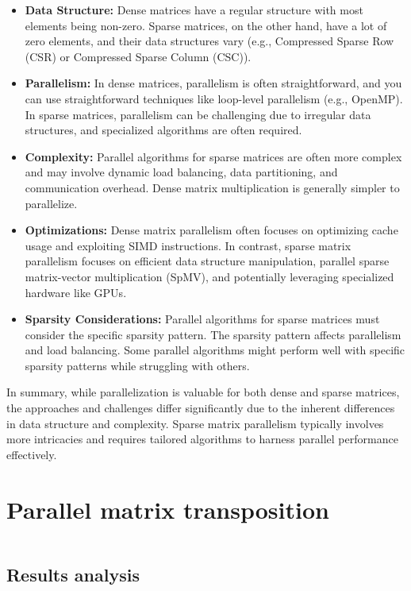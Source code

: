 \documentclass{article}
\begin{document}
\begin{itemize}
    \item \textbf{Data Structure:} Dense matrices have a regular structure with most elements being non-zero. Sparse matrices, on the other hand, have a lot of zero elements, and their data structures vary (e.g., Compressed Sparse Row (CSR) or Compressed Sparse Column (CSC)).
    \item \textbf{Parallelism:} In dense matrices, parallelism is often straightforward, and you can use straightforward techniques like loop-level parallelism (e.g., OpenMP). In sparse matrices, parallelism can be challenging due to irregular data structures, and specialized algorithms are often required.
    \item \textbf{Complexity:} Parallel algorithms for sparse matrices are often more complex and may involve dynamic load balancing, data partitioning, and communication overhead. Dense matrix multiplication is generally simpler to parallelize.
    \item \textbf{Optimizations:} Dense matrix parallelism often focuses on optimizing cache usage and exploiting SIMD instructions. In contrast, sparse matrix parallelism focuses on efficient data structure manipulation, parallel sparse matrix-vector multiplication (SpMV), and potentially leveraging specialized hardware like GPUs.
    \item \textbf{Sparsity Considerations:} Parallel algorithms for sparse matrices must consider the specific sparsity pattern. The sparsity pattern affects parallelism and load balancing. Some parallel algorithms might perform well with specific sparsity patterns while struggling with others.
\end{itemize}

In summary, while parallelization is valuable for both dense and sparse matrices, the approaches and challenges differ significantly due to the inherent differences in data structure and complexity. Sparse matrix parallelism typically involves more intricacies and requires tailored algorithms to harness parallel performance effectively.
\clearpage
\section{Parallel matrix transposition}

\begin{code}
    \begin{verbatim}

    \end{verbatim}
\end{code}

\subsection*{Results analysis}
\end{document}

